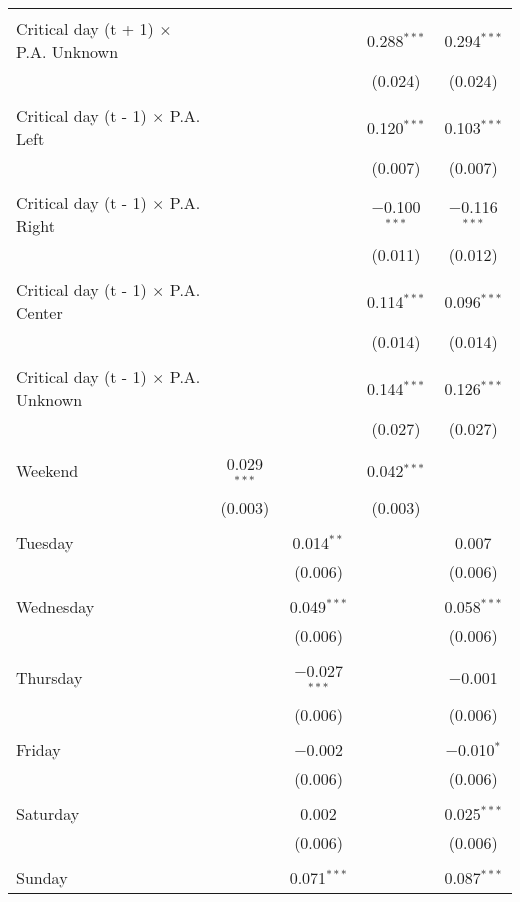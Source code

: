 \documentclass[
]{article}
\begin{document}
\begin{table}[!htbp]
{\begin{tabular}{@{\extracolsep{5pt}}lcccc}
  & & & & \\ 
 Critical day (t + 1) $\times$ P.A. Unknown &  &  & 0.288$^{***}$ & 0.294$^{***}$ \\ 
  &  &  & (0.024) & (0.024) \\ 
  & & & & \\ 
 Critical day (t - 1) $\times$ P.A. Left &  &  & 0.120$^{***}$ & 0.103$^{***}$ \\ 
  &  &  & (0.007) & (0.007) \\ 
  & & & & \\ 
 Critical day (t - 1) $\times$ P.A. Right &  &  & $-$0.100$^{***}$ & $-$0.116$^{***}$ \\ 
  &  &  & (0.011) & (0.012) \\ 
  & & & & \\ 
 Critical day (t - 1) $\times$ P.A. Center &  &  & 0.114$^{***}$ & 0.096$^{***}$ \\ 
  &  &  & (0.014) & (0.014) \\ 
  & & & & \\ 
 Critical day (t - 1) $\times$ P.A. Unknown &  &  & 0.144$^{***}$ & 0.126$^{***}$ \\ 
  &  &  & (0.027) & (0.027) \\ 
  & & & & \\ 
 Weekend & 0.029$^{***}$ &  & 0.042$^{***}$ &  \\ 
  & (0.003) &  & (0.003) &  \\ 
  & & & & \\ 
 Tuesday &  & 0.014$^{**}$ &  & 0.007 \\ 
  &  & (0.006) &  & (0.006) \\ 
  & & & & \\ 
 Wednesday &  & 0.049$^{***}$ &  & 0.058$^{***}$ \\ 
  &  & (0.006) &  & (0.006) \\ 
  & & & & \\ 
 Thursday &  & $-$0.027$^{***}$ &  & $-$0.001 \\ 
  &  & (0.006) &  & (0.006) \\ 
  & & & & \\ 
 Friday &  & $-$0.002 &  & $-$0.010$^{*}$ \\ 
  &  & (0.006) &  & (0.006) \\ 
  & & & & \\ 
 Saturday &  & 0.002 &  & 0.025$^{***}$ \\ 
  &  & (0.006) &  & (0.006) \\ 
  & & & & \\ 
 Sunday &  & 0.071$^{***}$ &  & 0.087$^{***}$ \\ 

\end{tabular}}
\end{table}
\end{document}
